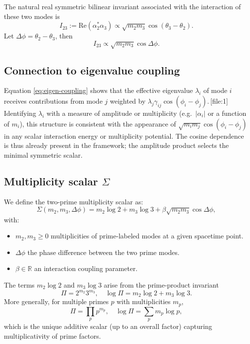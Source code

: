 \documentclass[11pt]{article}
\begin{document}
The natural real symmetric bilinear invariant associated with the interaction of these two modes is
\[
I_{23} := \mathrm{Re}(\alpha_2^*\alpha_3) \propto \sqrt{m_2m_3}\cos(\theta_3-\theta_2).
\]
Let \(\Delta\phi = \theta_2-\theta_3\), then
\[
I_{23} \propto \sqrt{m_2m_3}\cos\Delta\phi.
\]

\subsection{Connection to eigenvalue coupling}

Equation \eqref{eq:eigen-coupling} shows that the effective eigenvalue \(\lambda_i\) of mode \(i\) receives contributions from mode \(j\) weighted by \(\lambda_j\gamma_{ij}\cos(\phi_i-\phi_j)\).\,[file:1] Identifying \(\lambda_i\) with a measure of amplitude or multiplicity (e.g.\ \(|\alpha_i|\) or a function of \(m_i\)), this structure is consistent with the appearance of \(\sqrt{m_i m_j}\cos(\phi_i-\phi_j)\) in any scalar interaction energy or multiplicity potential. The cosine dependence is thus already present in the framework; the amplitude product selects the minimal symmetric scalar.

\subsection{Multiplicity scalar \texorpdfstring{\(\Sigma\)}{Sigma}}

We define the two-prime multiplicity scalar as:
\begin{equation}
\Sigma(m_2,m_3,\Delta\phi) =
m_2\log 2 + m_3\log 3 + \beta \sqrt{m_2 m_3} \cos\Delta\phi,
\label{eq:sigma-two-prime}
\end{equation}
with:
\begin{itemize}
\item \(m_2,m_3\ge 0\) multiplicities of prime-labeled modes at a given spacetime point.
\item \(\Delta\phi\) the phase difference between the two prime modes.
\item \(\beta\in\mathbb{R}\) an interaction coupling parameter.
\end{itemize}

The terms \(m_2\log 2\) and \(m_3\log 3\) arise from the prime-product invariant
\[
\Pi = 2^{m_2}3^{m_3},\quad \log\Pi = m_2\log 2 + m_3\log 3.
\]
More generally, for multiple primes \(p\) with multiplicities \(m_p\),
\[
\Pi = \prod_p p^{m_p},\quad \log\Pi = \sum_p m_p\log p,
\]
which is the unique additive scalar (up to an overall factor) capturing multiplicativity of prime factors.
\end{document}
